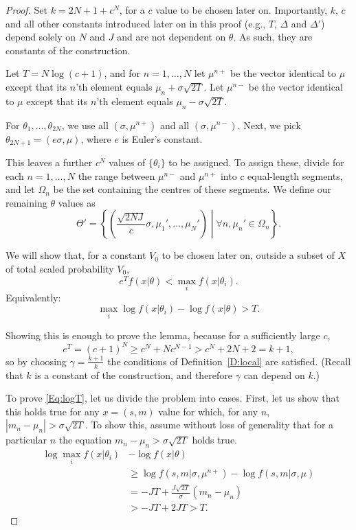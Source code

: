 \documentclass{IEEEtran}
\begin{document}
\begin{proof}
Set $k=2N+1+c^N$, for a $c$ value to be chosen later on.
Importantly, $k$, $c$ and all other constants introduced later on in this
proof (e.g., $T$, $\Delta$ and $\Delta'$) depend solely on $N$ and $J$ and
are not dependent on $\theta$. As such, they are constants of the
construction.

Let $T=N \log(c+1)$, and for $n=1,\ldots,N$
let $\mu^{n+}$ be the vector identical to $\mu$ except that its $n$'th
element equals $\mu_n+\sigma\sqrt{2 T}$.
Let $\mu^{n-}$ be the vector identical to $\mu$
except that its $n$'th element equals $\mu_n-\sigma\sqrt{2 T}$.

For $\theta_1,\ldots,\theta_{2N}$, we use all
$(\sigma, \mu^{n+})$ and all $(\sigma, \mu^{n-})$.
Next, we pick $\theta_{2N+1}=(e\sigma,\mu)$, where $e$ is
Euler's constant.

This leaves a further $c^N$ values of $\{\theta_i\}$ to be assigned. To assign these,
divide for each $n=1,\ldots,N$ the range between $\mu^{n-}$ and $\mu^{n+}$
into $c$ equal-length segments, and let $\Omega_n$ be the set containing the
centres of these segments. We define our remaining $\theta$ values as
\[
\Theta'=\left\{\left(\frac{\sqrt{2NJ}}{c}\sigma,\mu_1',\ldots,\mu_N'\right)\middle|\forall n, \mu_n'\in\Omega_n\right\}.
\]

We will show that, for a constant $V_0$ to be chosen later on,
outside a subset of $X$ of total scaled probability $V_0$,
\[
e^T f(x|\theta) < \max_i f(x|\theta_i).
\]
Equivalently:
\begin{equation}\label{Eq:logT}
\max_i \log f(x|\theta_i) - \log f(x|\theta) > T.
\end{equation}

Showing this is enough to prove the lemma, because for a sufficiently large
$c$,
\[
e^T=(c+1)^N\ge c^N+Nc^{N-1}>c^N+2N+2=k+1,
\]
so by choosing $\gamma=\frac{k+1}{k}$ the conditions of
Definition~\ref{D:local} are satisfied. (Recall that $k$ is a constant of the
construction, and therefore $\gamma$ can depend on $k$.)

To prove \eqref{Eq:logT}, let us divide the problem into cases. First, let us
show that this holds true for any $x=(s,m)$ value for which, for any $n$,
$|m_n-\mu_n|>\sigma\sqrt{2T}$. To show this, assume without loss of generality
that for a particular $n$ the equation $m_n-\mu_n>\sigma\sqrt{2T}$ holds true.
\begin{align*}
\log \max_i f(x|\theta_i) & -\log f(x|\theta) \\
&\ge \log f(s,m|\sigma,\mu^{n+}) -\log f(s,m|\sigma,\mu) \\
&=-JT+\frac{J\sqrt{2T}}{\sigma}(m_n-\mu_n) \\
&>-JT+2JT
>T.
\end{align*}


\end{proof}
\end{document}
